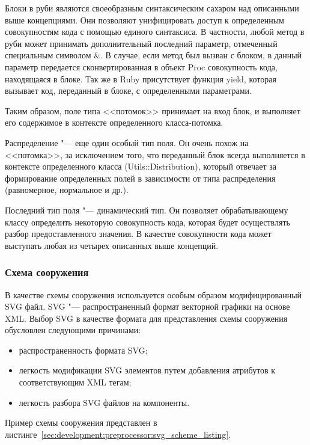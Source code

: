 Блоки в руби являются своеобразным синтаксическим сахаром над описанными выше концепциями.
Они позволяют унифицировать доступ к определенным совокупностям кода с помощью единого синтаксиса.
В частности, любой метод в руби может принимать дополнительный последний параметр, отмеченный специальным символом \&.
В случае, если метод был вызван с блоком, в данный параметр передается сконвертированная в объект Proc совокупность кода, находящаяся в блоке.
Так же в Ruby присутствует функция yield, которая вызывает код, переданный в блоке, с определенными параметрами.

Таким образом, поле типа <<потомок>> принимает на вход блок, и выполняет его содержимое в контексте определенного класса-потомка.

Распределение "--- еще один особый тип поля. Он очень похож на <<потомка>>, за исключением того, что переданный блок всегда выполняется в контексте определенного класса (Utils::Distribution),
который отвечает за формирование определенных полей в зависимости от типа распределения (равномерное, нормальное и др.).

Последний тип поля "--- динамический тип. Он позволяет обрабатывающему классу определить некоторую совокупность кода, которая будет осуществлять разбор предоставленного значения.
В качестве совокупности кода может выступать любая из четырех описанных выше концепций.

\subsubsection{Схема сооружения}
\label{sec:development:preprocessor:svg_scheme}

В качестве схемы сооружения используется особым образом модифицированный SVG файл.
SVG "--- распространенный формат векторной графики на основе XML.
Выбор SVG в качестве формата для представления схемы сооружения обусловлен следующими причинами:
\begin{itemize}
  \item распространенность формата SVG;
  \item легкость модификации SVG элементов путем добавления атрибутов к соответствующим XML тегам;
  \item легкость разбора SVG файлов на компоненты.
\end{itemize}

Пример схемы сооружения представлен в листинге~\ref{sec:development:preprocessor:svg_scheme_listing}.



